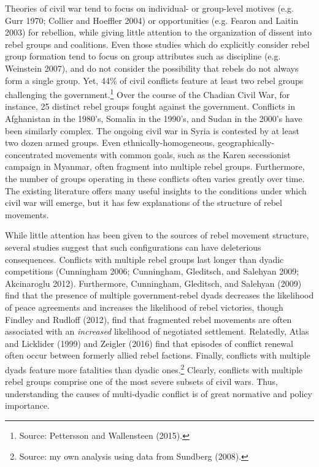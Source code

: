 \documentclass[12pt,]{article}
\let\rmarkdownfootnote\footnote%
\def\footnote{\protect\rmarkdownfootnote}
\begin{document}
Theories of civil war tend to focus on individual- or group-level
motives (e.g. Gurr 1970; Collier and Hoeffler 2004) or opportunities
(e.g. Fearon and Laitin 2003) for rebellion, while giving little
attention to the organization of dissent into rebel groups and
coalitions. Even those studies which do explicitly consider rebel group
formation tend to focus on group attributes such as discipline (e.g.
Weinstein 2007), and do not consider the possibility that rebels do not
always form a single group. Yet, 44\% of civil conflicts feature at
least two rebel groups challenging the government.\footnote{Source:
  Pettersson and Wallensteen (2015).} Over the course of the Chadian
Civil War, for instance, 25 distinct rebel groups fought against the
government. Conflicts in Afghanistan in the 1980's, Somalia in the
1990's, and Sudan in the 2000's have been similarly complex. The ongoing
civil war in Syria is contested by at least two dozen armed groups. Even
ethnically-homogeneous, geographically-concentrated movements with
common goals, such as the Karen secessionist campaign in Myanmar, often
fragment into multiple rebel groups. Furthermore, the number of groups
operating in these conflicts often varies greatly over time. The
existing literature offers many useful insights to the conditions under
which civil war will emerge, but it has few explanations of the
structure of rebel movements.

While little attention has been given to the sources of rebel movement
structure, several studies suggest that such configurations can have
deleterious consequences. Conflicts with multiple rebel groups last
longer than dyadic competitions (Cunningham 2006; Cunningham, Gleditsch,
and Salehyan 2009; Akcinaroglu 2012). Furthermore, Cunningham,
Gleditsch, and Salehyan (2009) find that the presence of multiple
government-rebel dyads decreases the likelihood of peace agreements and
increases the likelihood of rebel victories, though Findley and Rudloff
(2012), find that fragmented rebel movements are often associated with
an \emph{increased} likelihood of negotiated settlement. Relatedly,
Atlas and Licklider (1999) and Zeigler (2016) find that episodes of
conflict renewal often occur between formerly allied rebel factions.
Finally, conflicts with multiple dyads feature more fatalities than
dyadic ones.\footnote{Source: my own analysis using data from Sundberg
  (2008).} Clearly, conflicts with multiple rebel groups comprise one of
the most severe subsets of civil wars. Thus, understanding the causes of
multi-dyadic conflict is of great normative and policy importance.
\end{document}
